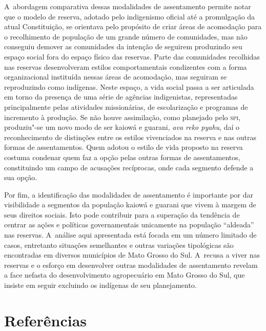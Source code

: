 A~abordagem comparativa dessas modalidades de assentamento permite notar
que o modelo de reserva, adotado pelo indigenismo oficial até a
promulgação da atual Constituição, se orientava pelo propósito de criar
áreas de acomodação para o recolhimento de população de um grande
número de comunidades, mas não conseguiu demover as comunidades da
intenção de seguirem produzindo seu espaço social fora do espaço físico
das reservas. Parte das comunidades recolhidas nas reservas
desenvolveram estilos comportamentais condizentes com a forma
organizacional instituída nessas áreas de acomodação, mas seguiram se
reproduzindo como indígenas. Neste espaço, a vida social passa a ser
articulada em torno da presença de uma série de agências indigenistas,
representadas principalmente pelas atividades missionárias, de
escolarização e programas de incremento à produção. Se não houve
assimilação, como planejado pelo \textsc{spi}, produziu"-se um novo modo de ser
kaiowá e guarani, \emph{ava reko pyahu}, daí o reconhecimento de distinções
entre os estilos vivenciados na reserva e nas outras formas de
assentamentos. Quem adotou o estilo de vida proposto na reserva costuma
condenar quem faz a opção pelas outras formas de assentamentos,
constituindo um campo de acusações recíprocas, onde cada segmento
defende a sua opção.

Por fim, a identificação das modalidades de assentamento é importante
por dar visibilidade a segmentos da população kaiowá e guarani que
vivem à margem de seus direitos sociais. Isto pode contribuir para a
superação da tendência de centrar as ações e políticas governamentais
unicamente na população ``aldeada'' nas reservas. A~análise aqui
apresentada está focada em um número limitado de casos, entretanto
situações semelhantes e outras variações tipológicas são encontradas em
diversos municípios de Mato Grosso do Sul. A~recusa a viver nas
reservas e o esforço em desenvolver outras modalidades de assentamento
revelam a face nefasta do desenvolvimento agropecuário em Mato Grosso
do Sul, que insiste em seguir excluindo os indígenas de seu
planejamento.

\section{Referências}

